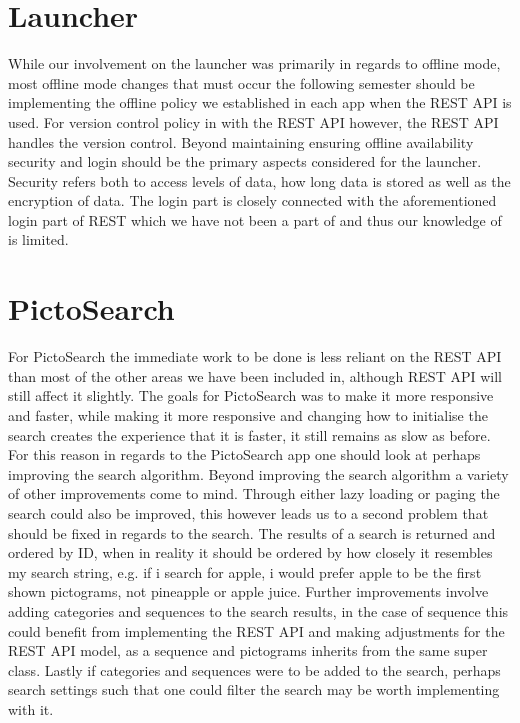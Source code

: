\section{Launcher}
While our involvement on the launcher was primarily in regards to offline mode, most offline mode changes that must occur the following semester should be implementing the offline policy we established in each app when the REST API is used.
For version control policy in with the REST API however, the REST API handles the version control.
Beyond maintaining ensuring offline availability security and login should be the primary aspects considered for the launcher.
Security refers both to access levels of data, how long data is stored as well as the encryption of data.
The login part is closely connected with the aforementioned login part of REST which we have not been a part of and thus our knowledge of is limited.

\section{PictoSearch}
For PictoSearch the immediate work to be done is less reliant on the REST API than most of the other areas we have been included in, although REST API will still affect it slightly.
The goals for PictoSearch was to make it more responsive and faster, while making it more responsive and changing how to initialise the search creates the experience that it is faster, it still remains as slow as before.
For this reason in regards to the PictoSearch app one should look at perhaps improving the search algorithm.
Beyond improving the search algorithm a variety of other improvements come to mind.
Through either lazy loading or paging the search could also be improved, this however leads us to a second problem that should be fixed in regards to the search.
The results of a search is returned and ordered by ID, when in reality it should be ordered by how closely it resembles my search string, e.g. if i search for apple, i would prefer apple to be the first shown pictograms, not pineapple or apple juice.
Further improvements involve adding categories and sequences to the search results, in the case of sequence this could benefit from implementing the REST API and making adjustments for the REST API model, as a sequence and pictograms inherits from the same super class.
Lastly if categories and sequences were to be added to the search, perhaps search settings such that one could filter the search may be worth implementing with it.

